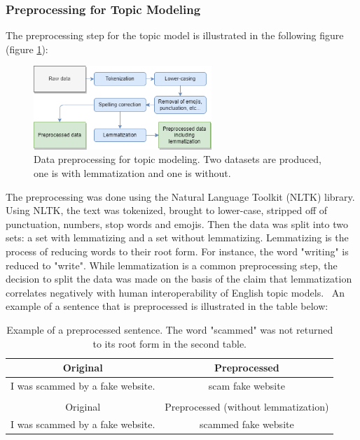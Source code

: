 \subsubsection*{Preprocessing for Topic Modeling}

The preprocessing step for the topic model is illustrated in the following figure (figure \ref{fig:preprocessing_topic_modeling}):

\begin{figure}[h]
    \centering
    \includegraphics[width=0.6\textwidth]{resources/preprocessing_topic_modeling.png}
    \caption{Data preprocessing for topic modeling. Two datasets are produced, one is with lemmatization and one is without.}
    \label{fig:preprocessing_topic_modeling}
\end{figure}

The preprocessing was done using the Natural Language Toolkit (NLTK) library. Using NLTK, the text was tokenized, brought to lower-case, stripped off of punctuation, numbers, stop words and emojis. Then the data was split into two sets: a set with lemmatizing and a set without lemmatizing. Lemmatizing is the process of reducing words to their root form. For instance, the word "writing" is reduced to "write". While lemmatization is a common preprocessing step, the decision to split the data was made on the basis of the claim that lemmatization correlates negatively with human interoperability of English topic models.~\cite{schofield2016comparing} An example of a sentence that is preprocessed is illustrated in the table below:


\begin{table}[h]
    \centering
    \begin{tabular}{cc}
        Original & Preprocessed \\ \hline
        I was scammed by a fake website. & scam fake website \\
        \\
        Original & Preprocessed (without lemmatization) \\ \hline
        I was scammed by a fake website. & scammed fake website \\
    \end{tabular}
    \caption{Example of a preprocessed sentence. The word "scammed" was not returned to its root form in the second table.}
    \label{tab:preprocessing}
\end{table}

